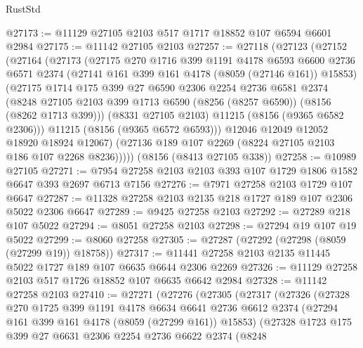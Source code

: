 \begin{lexlean}{RustStd}
\begin{coremodule}
@27173 := @11129 @27105 @2103 @517 @1717 @18852 @107 @6594 @6601 @2984
@27175 := @11142 @27105 @2103
@27257 := @27118
    (@27123
      (@27152
        (@27164
          (@27173
            (@27175
              @270
              @1716
              @399
              @1191
              @4178
              @6593
              @6600
              @2736
              @6571
              @2374
              (@27141 @161 @399 @161 @4178 (@8059 (@27146 @161)) @15853)
              (@27175
                @1714
                @175
                @399
                @27
                @6590
                @2306
                @2254
                @2736
                @6581
                @2374
                (@8248
                  @27105
                  @2103
                  @399
                  @1713
                  @6590
                  (@8256 (@8257 @6590))
                  (@8156 (@8262 @1713 @399)))
                (@8331 @27105 @2103)
                @11215
                (@8156 (@9365 @6582 @2306)))
              @11215
              (@8156 (@9365 @6572 @6593)))
            @12046
            @12049
            @12052
            @18920
            @18924
            @12067)
          (@27136 @189 @107 @2269 (@8224 @27105 @2103 @186 @107 @2268 @8236)))))
    (@8156 (@8413 @27105 @338))
@27258 := @10989 @27105
@27271 := @7954 @27258 @2103 @2103 @393 @107 @1729 @1806 @1582 @6647 @393 @2697 @6713 @7156
@27276 := @7971 @27258 @2103 @1729 @107 @6647
@27287 := @11328 @27258 @2103 @2135 @218 @1727 @189 @107 @2306 @5022 @2306 @6647
@27289 := @9425 @27258 @2103
@27292 := @27289 @218 @107 @5022
@27294 := @8051 @27258 @2103
@27298 := @27294 @19 @107 @19 @5022
@27299 := @8060 @27258
@27305 := @27287 (@27292 (@27298 (@8059 (@27299 @19)) @18758))
@27317 := @11441 @27258 @2103 @2135 @11445 @5022 @1727 @189 @107 @6635 @6644 @2306 @2269
@27326 := @11129 @27258 @2103 @517 @1726 @18852 @107 @6635 @6642 @2984
@27328 := @11142 @27258 @2103
@27410 := @27271
    (@27276
      (@27305
        (@27317
          (@27326
            (@27328
              @270
              @1725
              @399
              @1191
              @4178
              @6634
              @6641
              @2736
              @6612
              @2374
              (@27294 @161 @399 @161 @4178 (@8059 (@27299 @161)) @15853)
              (@27328
                @1723
                @175
                @399
                @27
                @6631
                @2306
                @2254
                @2736
                @6622
                @2374
                (@8248

\end{coremodule}
\end{lexlean}

